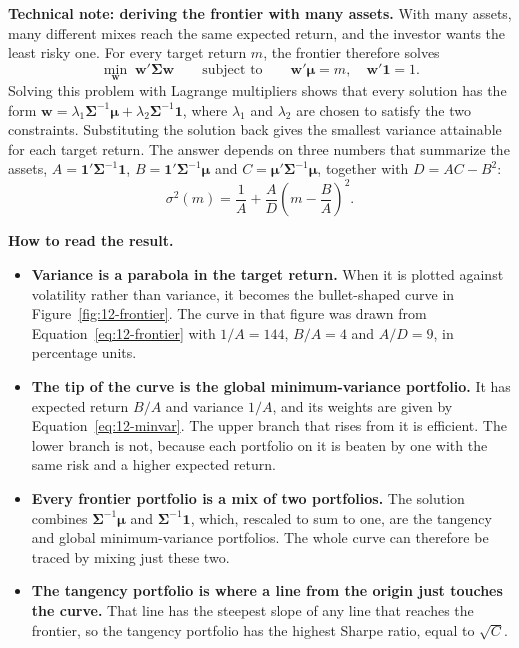 \begin{callout}
\textbf{Technical note: deriving the frontier with many assets.} With many assets, many different mixes reach the same expected return, and the investor wants the least risky one. For every target return $m$, the frontier therefore solves
\begin{equation}
  \min_{\mathbf{w}} \; \mathbf{w}'\boldsymbol{\Sigma}\mathbf{w}
  \qquad \text{subject to} \qquad \mathbf{w}'\boldsymbol{\mu} = m, \quad \mathbf{w}'\mathbf{1} = 1.
  \label{eq:12-frontier-problem}
\end{equation}
Solving this problem with Lagrange multipliers shows that every solution has the form $\mathbf{w} = \lambda_1 \boldsymbol{\Sigma}^{-1}\boldsymbol{\mu} + \lambda_2 \boldsymbol{\Sigma}^{-1}\mathbf{1}$, where $\lambda_1$ and $\lambda_2$ are chosen to satisfy the two constraints. Substituting the solution back gives the smallest variance attainable for each target return. The answer depends on three numbers that summarize the assets, $A = \mathbf{1}'\boldsymbol{\Sigma}^{-1}\mathbf{1}$, $B = \mathbf{1}'\boldsymbol{\Sigma}^{-1}\boldsymbol{\mu}$ and $C = \boldsymbol{\mu}'\boldsymbol{\Sigma}^{-1}\boldsymbol{\mu}$, together with $D = AC - B^2$:
\begin{equation}
  \sigma^2(m) = \frac{1}{A} + \frac{A}{D}\left(m - \frac{B}{A}\right)^2.
  \label{eq:12-frontier}
\end{equation}

\textbf{How to read the result.}
\begin{itemize}
  \item \textbf{Variance is a parabola in the target return.} When it is plotted against volatility rather than variance, it becomes the bullet-shaped curve in Figure~\ref{fig:12-frontier}. The curve in that figure was drawn from Equation~\eqref{eq:12-frontier} with $1/A = 144$, $B/A = 4$ and $A/D = 9$, in percentage units.
  \item \textbf{The tip of the curve is the global minimum-variance portfolio.} It has expected return $B/A$ and variance $1/A$, and its weights are given by Equation~\eqref{eq:12-minvar}. The upper branch that rises from it is efficient. The lower branch is not, because each portfolio on it is beaten by one with the same risk and a higher expected return.
  \item \textbf{Every frontier portfolio is a mix of two portfolios.} The solution combines $\boldsymbol{\Sigma}^{-1}\boldsymbol{\mu}$ and $\boldsymbol{\Sigma}^{-1}\mathbf{1}$, which, rescaled to sum to one, are the tangency and global minimum-variance portfolios. The whole curve can therefore be traced by mixing just these two.
  \item \textbf{The tangency portfolio is where a line from the origin just touches the curve.} That line has the steepest slope of any line that reaches the frontier, so the tangency portfolio has the highest Sharpe ratio, equal to $\sqrt{C}$.
\end{itemize}
\end{callout}

